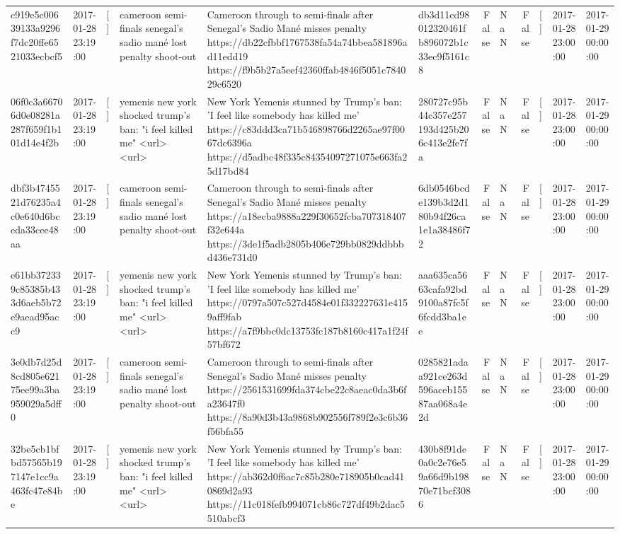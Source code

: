 \begin{tabular}{llllllrlrlll}
c919e5c00639133a9296f7dc20ffe6521033ecbcf5 & 2017-01-28 23:19:00 & [] & cameroon semi-finals senegal's sadio mané lost penalty shoot-out & Cameroon through to semi-finals after Senegal’s Sadio Mané misses penalty https://db22cfbbf1767538fa54a74bbea581896ad11edd19 https://f9b5b27a5eef42360ffab4846f5051c784029c6520 & db3d11cd98012320461fb896072b1c33ec9f5161c8 & False & NaN & False & [] & 2017-01-28 23:00:00 & 2017-01-29 00:00:00 \\
06f0c3a66706d0e08281a287f659f1b101d14e4f2b & 2017-01-28 23:19:00 & [] & yemenis new york shocked trump's ban: "i feel killed me" <url> <url> & New York Yemenis stunned by Trump's ban: 'I feel like somebody has killed me' https://c83ddd3ca71b546898766d2265ae97f0067dc6396a https://d5adbc48f335c84354097271075e663fa25d17bd84 & 280727c95b44c357e257193d425b206c413e2fe7fa & False & NaN & False & [] & 2017-01-28 23:00:00 & 2017-01-29 00:00:00 \\
dbf3b4745521d76235a4c0e640d6bceda33cee48aa & 2017-01-28 23:19:00 & [] & cameroon semi-finals senegal's sadio mané lost penalty shoot-out & Cameroon through to semi-finals after Senegal’s Sadio Mané misses penalty https://a18ecba9888a229f30652fcba707318407f32e644a https://3de1f5adb2805b406e729bb0829ddbbbd436e731d0 & 6db0546bcde139b3d2d180b94f26ca1e1a38486f72 & False & NaN & False & [] & 2017-01-28 23:00:00 & 2017-01-29 00:00:00 \\
e61bb372339c85385b433d6aeb5b72e9aead95acc9 & 2017-01-28 23:19:00 & [] & yemenis new york shocked trump's ban: "i feel killed me" <url> <url> & New York Yemenis stunned by Trump's ban: 'I feel like somebody has killed me' https://0797a507c527d4584e01f332227631e4159aff9fab https://a7f9bbc0dc13753fc187b8160c417a1f24f57bf672 & aaa635ca5663cafa92bd9100a87fc5f6fcdd3ba1ee & False & NaN & False & [] & 2017-01-28 23:00:00 & 2017-01-29 00:00:00 \\
3e0db7d25d8cd805e62175ee99a3ba959029a5dff0 & 2017-01-28 23:19:00 & [] & cameroon semi-finals senegal's sadio mané lost penalty shoot-out & Cameroon through to semi-finals after Senegal’s Sadio Mané misses penalty https://2561531699fda374cbe22c8aeac0da3b6fa23647f0 https://8a90d3b43a9868b902556f789f2e3c6b36f56bfa55 & 0285821adaa921ce263d596aceb15587aa068a4e2d & False & NaN & False & [] & 2017-01-28 23:00:00 & 2017-01-29 00:00:00 \\
32be5cb1bfbd57565b197147e1cc9a463fc47e84be & 2017-01-28 23:19:00 & [] & yemenis new york shocked trump's ban: "i feel killed me" <url> <url> & New York Yemenis stunned by Trump's ban: 'I feel like somebody has killed me' https://ab362d0f6ac7c85b280e718905b0cad410869d2a93 https://11c018fefb994071cb86c727df49b2dac5510abcf3 & 430b8f91de0a0c2e76e59a66d9b19870e71bcf3086 & False & NaN & False & [] & 2017-01-28 23:00:00 & 2017-01-29 00:00:00 \\

\end{tabular}
